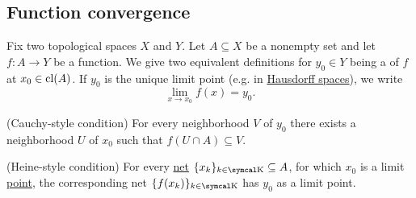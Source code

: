 \subsection{Function convergence}\label{subsec:function_convergence}

\begin{definition}\label{def:local_convergence}
  Fix two topological spaces \( X \) and \( Y \). Let \( A \subseteq X \) be a nonempty set and let \( f: A \to Y \) be a function. We give two equivalent definitions for \( y_0 \in Y \) being a  of \( f \) at \( x_0 \in \operatorname{cl}(A) \). If \( y_0 \) is the unique limit point (e.g. in \hyperref[def:separation_axioms/T2]{Hausdorff spaces}), we write
  \begin{equation*}
    \lim_{x \to x_0} f(x) = y_0.
  \end{equation*}

  \begin{DefEnum}
    (Cauchy-style condition) For every neighborhood \( V \) of \( y_0 \) there exists a neighborhood \( U \) of \( x_0 \) such that \( f(U \cap A) \subseteq V \).

    (Heine-style condition) For every \hyperref[def:topological_net]{net} \( \{ x_k \}_{k \in \CK} \subseteq A \), for which \( x_0 \) is a limit \hyperref[def:net_convergence/limit]{point}, the corresponding net \( \{ f(x_k) \}_{k \in \CK} \) has \( y_0 \) as a limit point.
  \end{DefEnum}
\end{definition}
